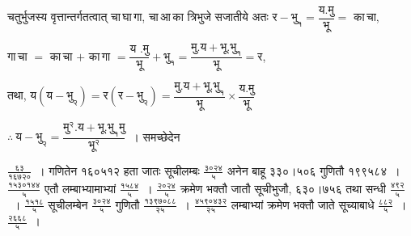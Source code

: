 \documentclass[11pt, openany]{book}
\begin{document}
{\vspace{1mm}
\hspace{3mm} चतुर्भुजस्य वृत्तान्तर्गतत्वात् चा\,घा\,गा, चा\,आ\,का त्रिभुजे सजातीये अतः $\mbox{र} - \mbox{भु}_{\text{१}} = \dfrac{\mbox{य.मु}}{\mbox{भू}} =$ का\,चा,

\vspace{1mm}
\hspace{3mm} गा\,चा $=$ का\,चा $+$ का\,गा $= \dfrac{\mbox{य .मु}}{\mbox{भू}} + \mbox{भु}_{\text{१}} = \dfrac{\mbox{मु.य} + \mbox{भू.भु}_{\text{१}}}{\mbox{भू}} = \mbox{र}$,

\vspace{1mm}
\hspace{3mm} तथा, $\mbox{य}\left(\mbox{य} - \mbox{भु}_{\text{२}}\right) = \mbox{र}\left(\mbox{र} - \mbox{भु}_{\text{२}}\right) = \dfrac{\mbox{मु.य} + \mbox{भू.भु}_{\text{१}}}{\mbox{भू}} \times \dfrac{\mbox{य.मु}}{\mbox{भू}}$

\vspace{2mm}
\hspace{3mm} $\therefore~ \mbox{य} - \mbox{भु}_{\text{२}} = \dfrac{\mbox{मु}^{\text{२}}.\mbox{य} + \mbox{भू.भु}_{\text{१}}\mbox{मु}}{\mbox{भू}^{\text{२}}}$~। समच्छेदेन}
\newpage%

\noindent $\frac{\mbox{६३}}{\mbox{१६७२०}}$~। गणितेन १६०५१२ हता जातः सूचीलम्बः $\frac{\mbox{३०२४}}{\mbox{५}}$ अनेन बाहू ३३०।५०६ गुणितौ १९९५८४~। $\frac{\mbox{१५३०१४४}}{\mbox{५}}$ एतौ लम्बाभ्यामाभ्यां $\frac{\mbox{१५८४}}{\mbox{५}}$~। $\frac{\mbox{२०२४}}{\mbox{५}}$ क्रमेण भक्तौ जातौ सूचीभुजौ, ६३०।७५६ तथा सन्धी $\frac{\mbox{४९२}}{\mbox{५}}$~। $\frac{\mbox{१५१८}}{\mbox{५}}$ सूचीलम्बेन $\frac{\mbox{३०२४}}{\mbox{५}}$ गुणितौ $\frac{\mbox{१३९७०८८}}{\mbox{२५}}$~। $\frac{\mbox{४५९०४३२}}{\mbox{२५}}$ लम्बाभ्यां क्रमेण भक्तौ जाते सूच्याबाधे $\frac{\mbox{८८२}}{\mbox{५}}$~। $\frac{\mbox{२६६८}}{\mbox{५}}$~।
\end{document}
